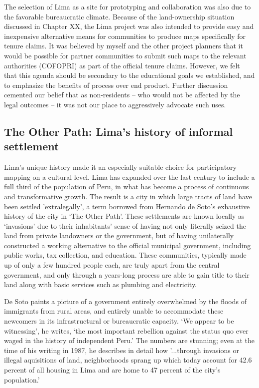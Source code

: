 \documentclass[11pt]{report}
\begin{document}
The selection of Lima as a site for prototyping and collaboration was also due to the favorable bureaucratic climate. Because of the land-ownership situation discussed in Chapter XX, the Lima project was also intended to provide easy and inexpensive alternative means for communities to produce maps specifically for tenure claims. It was believed by myself and the other project planners that it would be possible for partner communities to submit such maps to the relevant authorities (COFOPRI) as part of the official tenure claims. However, we felt that this agenda should be secondary to the educational goals we established, and to emphasize the benefits of process over end product. Further discussion cemented our belief that as non-residents -- who would not be affected by the legal outcomes -- it was not our place to aggressively advocate such uses. 

\subsection{The Other Path: Lima's history of informal settlement}

Lima's unique history made it an especially suitable choice for participatory mapping on a cultural level. Lima has expanded over the last century to include a full third of the population of Peru, in what has become a process of continuous and transformative growth. The result is a city in which large tracts of land have been settled 'extralegally', a term borrowed from Hernando de Soto's exhaustive history of the city in `The Other Path'. These settlements are known locally as `invasions' due to their inhabitants' sense of having not only literally seized the land from private landowners or the government, but of having unilaterally constructed a working alternative to the official municipal government, including public works, tax collection, and education. These communities, typically made up of only a few hundred people each, are truly apart from the central government, and only through a years-long process are able to gain title to their land along with basic services such as plumbing and electricity.

De Soto paints a picture of a government entirely overwhelmed by the floods of immigrants from rural areas, and entirely unable to accommodate these newcomers in its infrastructural or bureaucratic capacity. `We appear to be witnessing', he writes, `the most important rebellion against the status quo ever waged in the history of independent Peru.' The numbers are stunning; even at the time of his writing in 1987, he describes in detail how '...through invasions or illegal aquisitions of land, neighborhoods sprang up which today account for 42.6 percent of all housing in Lima and are home to 47 percent of the city's population.' \cite{desoto1987sendero}
\end{document}

